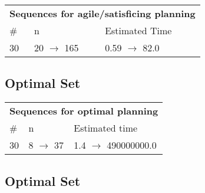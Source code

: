 \documentclass{article}
\begin{document}
                        \begin{center}
                        \begin{tabular}{l|l|l}
                        \multicolumn{3}{c}{\bf \large Sequences for agile/satisficing planning}\\
                        \# & n & Estimated Time\\\midrule
                        30&20 $\rightarrow$ 165&0.59 $\rightarrow$ 82.0
                        \end{tabular}
                        \end{center}
                    
                            \subsection*{Optimal Set}

                            \begin{center}
                            \begin{tabular}{l|l|l}
                            \multicolumn{3}{c}{\bf \large Sequences for optimal planning}\\
                            \# & n & Estimated time\\\midrule
                            30&8 $\rightarrow$ 37&1.4 $\rightarrow$ 490000000.0
                            \end{tabular}
                            \end{center}
                    
                                \subsection*{Optimal Set}
                                
\end{document}
